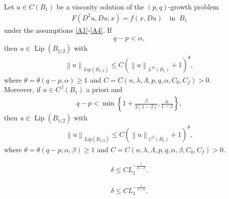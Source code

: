 \documentclass[10pt,a4paper]{amsart}
\newcommand{\Lip}{\operatorname{Lip}}
\newcommand{\norm}[1]{\left\lVert#1\right\rVert}
\begin{document}
\begin{thm} \label{Main1}
    Let $u \in C(B_1)$ be a viscosity solution of the $(p,q)$-growth problem
    \begin{align*}
        F(D^2u,Du,x) = f(x,Du) \quad \text{in } \ B_1
    \end{align*}
    under the assumptions \ref{A1}-\ref{A4}. If
    \begin{align} \label{gapl}
        q-p< \alpha,
    \end{align}
    then $u \in \Lip(B_{1/2})$ with
    \begin{align*}
        \norm{u}_{Lip(B_{1/2})} \leq C(\norm{u}_{L^\infty(B_1)}+1)^\theta,
    \end{align*}
    where $\theta = \theta(q-p,\alpha)\geq1$ and $C=C(n,\lambda,\Lambda,p,q,\alpha,C_0,C_f)>0$.\\
    Moreover, if $u \in C^\beta(B_1)$ a priori and
    \begin{align} \label{gapbl}
       q-p< \min \left\{1 + \frac{\beta}{2(1-\beta)}, \frac{\alpha}{1-\beta} \right\},
    \end{align}
    then 
    $u \in \Lip(B_{1/2})$ with
    \begin{align*}
        \norm{u}_{Lip(B_{1/2})} \leq C(\norm{u}_{C^\beta(B_1)}+1)^\theta,
    \end{align*}
    where $\theta = \theta(q-p,\alpha,\beta)\geq1$ and  $C=C(n,\lambda,\Lambda,p,q,\alpha,\beta,C_0,C_f)>0$.
\end{thm}

     \begin{align} \label{dest}
         \delta \leq CL_1^{-\frac{1}{\kappa-\beta}}.
     \end{align}

    \begin{align} \label{dest2}
        \delta \leq CL_1^{-\frac{1}{1-\kappa}}.
    \end{align}
\end{document}
